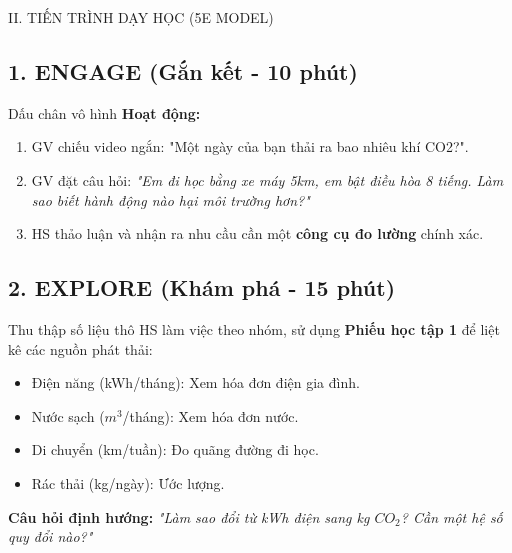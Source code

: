 \documentclass[12pt,a4paper]{article}
\begin{document}
\begin{sectionbox}{II. TIẾN TRÌNH DẠY HỌC (5E MODEL)}

\subsection*{1. ENGAGE (Gắn kết - 10 phút)}
\begin{activitybox}{Dấu chân vô hình}
\textbf{Hoạt động:}
\begin{enumerate}
    \item GV chiếu video ngắn: "Một ngày của bạn thải ra bao nhiêu khí CO2?".
    \item GV đặt câu hỏi: \textit{"Em đi học bằng xe máy 5km, em bật điều hòa 8 tiếng. Làm sao biết hành động nào hại môi trường hơn?"}
    \item HS thảo luận và nhận ra nhu cầu cần một \textbf{công cụ đo lường} chính xác.
\end{enumerate}
\end{activitybox}

\subsection*{2. EXPLORE (Khám phá - 15 phút)}
\begin{activitybox}{Thu thập số liệu thô}
HS làm việc theo nhóm, sử dụng \textbf{Phiếu học tập 1} để liệt kê các nguồn phát thải:
\begin{itemize}
    \item Điện năng (kWh/tháng): Xem hóa đơn điện gia đình.
    \item Nước sạch ($m^3$/tháng): Xem hóa đơn nước.
    \item Di chuyển (km/tuần): Đo quãng đường đi học.
    \item Rác thải (kg/ngày): Ước lượng.
\end{itemize}
\textbf{Câu hỏi định hướng:} \textit{"Làm sao đổi từ kWh điện sang kg $CO_2$? Cần một hệ số quy đổi nào?"}
\end{activitybox}


\end{sectionbox}
\end{document}

